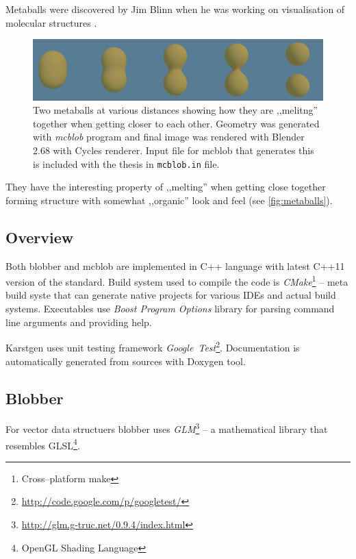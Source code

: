Metaballs were discovered by Jim Blinn when he was working on visualisation of
molecular structures \parencite{Blinn:1982:GAS:357306.357310}.
\label{sub:metaballs}
\begin{figure}[htb]
  \begin{center}
    \includegraphics[width=\textwidth]{chapters/project/metaballs.png}
  \end{center}
  \caption{Two metaballs at various distances showing how they are ,,melitng''
    together when getting closer to each other. Geometry was generated with
    \emph{mcblob} program and final image was rendered with Blender 2.68 with
    Cycles renderer. Input file for mcblob that generates this is included with the thesis
      in \texttt{mcblob.in} file.
  }
  \label{fig:metaballs}
\end{figure}

They have the interesting property of ,,melting'' when getting close together
forming structure with somewhat ,,organic'' look and feel (see \autoref{fig:metaballs}).

\subsection{Overview}
Both blobber and mcblob are implemented in C++ language with latest C++11
version of the standard. Build system used to compile the code is \emph{CMake}\footnote{Cross--platform make}
-- meta build syste that can generate native projects for various IDEs and
actual build systems.
Executables use \emph{Boost Program Options} library for parsing command line
arguments and providing help.

Karstgen uses unit testing framework \emph{Google~Test}\footnote{\url{http://code.google.com/p/googletest/}}.
Documentation is automatically generated from sources with Doxygen
tool.


\subsection{Blobber}

For vector data structuers blobber uses \emph{GLM}\footnote{\url{http://glm.g-truc.net/0.9.4/index.html}}
-- a mathematical library that resembles GLSL\footnote{OpenGL Shading Language}.

